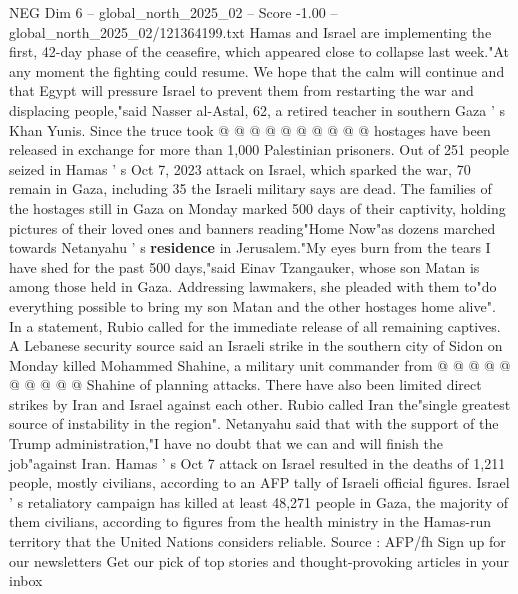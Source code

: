 \begin{textsample}{NEG Dim 6 – global\_north\_2025\_02 – Score -1.00 – global\_north\_2025\_02/121364199.txt}
Hamas and Israel are implementing the first, 42-day phase of the ceasefire, which appeared close to collapse last week."At any moment the fighting could resume.
We hope that the calm will continue and that Egypt will pressure Israel to prevent them from restarting the war and displacing people,"said Nasser al-Astal, 62, a retired teacher in southern Gaza ' s Khan Yunis.
Since the truce took @ @ @ @ @ @ @ @ @ @ hostages have been released in exchange for more than 1,000 Palestinian prisoners.
Out of 251 people seized in Hamas ' s Oct 7, 2023 attack on Israel, which sparked the war, 70 remain in Gaza, including 35 the Israeli military says are dead.
The families of the hostages still in Gaza on Monday marked 500 days of their captivity, holding pictures of their loved ones and banners reading"Home Now"as dozens marched towards Netanyahu ' s \textbf{residence} in Jerusalem."My eyes burn from the tears I have shed for the past 500 days,"said Einav Tzangauker, whose son Matan is among those held in Gaza.
Addressing lawmakers, she pleaded with them to"do everything possible to bring my son Matan and the other hostages home alive".
In a statement, Rubio called for the immediate release of all remaining captives.
A Lebanese security source said an Israeli strike in the southern city of Sidon on Monday killed Mohammed Shahine, a military unit commander from @ @ @ @ @ @ @ @ @ @ Shahine of planning attacks.
There have also been limited direct strikes by Iran and Israel against each other.
Rubio called Iran the"single greatest source of instability in the region".
Netanyahu said that with the support of the Trump administration,"I have no doubt that we can and will finish the job"against Iran.
Hamas ' s Oct 7 attack on Israel resulted in the deaths of 1,211 people, mostly civilians, according to an AFP tally of Israeli official figures.
Israel ' s retaliatory campaign has killed at least 48,271 people in Gaza, the majority of them civilians, according to figures from the health ministry in the Hamas-run territory that the United Nations considers reliable.
Source : AFP/fh Sign up for our newsletters Get our pick of top stories and thought-provoking articles in your inbox

\end{textsample}
